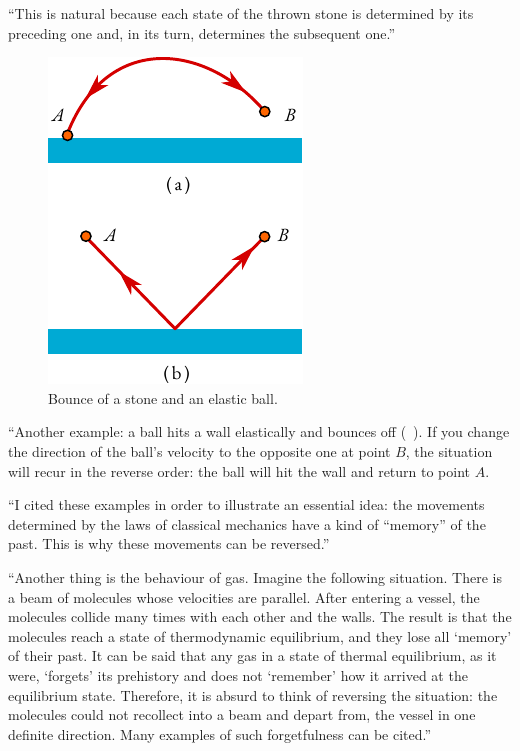\begin{dialogue}
\prtnr ``This is natural because each state of the thrown stone is
determined by its preceding one and, in its turn, determines the subsequent one.''
\begin{figure}%
\centering
\includegraphics[width=\textwidth]{figures/reflect.pdf}
\caption{Bounce of a stone and an elastic ball.\label{reflect}}
\end{figure}

\athr ``Another example: a ball hits a wall elastically and bounces
off (~). If you change the direction of the ball's velocity to the opposite one at point $B$, the situation will recur in the reverse order: the ball will hit the wall and return to point $A$.

``I cited these examples in order to illustrate an essential idea: the movements determined by the laws of classical mechanics have a kind of ``memory'' of the past. This is why these movements can be reversed.''

``Another thing is the behaviour of gas. Imagine the following situation. There is a beam of molecules whose velocities are parallel. After entering a vessel, the molecules collide many times with each other and the walls. The result is that the molecules reach a state of thermodynamic equilibrium, and they lose all `memory' of their past. It can be said that any gas in a state of thermal equilibrium, as it were, `forgets' its prehistory and does not `remember' how it arrived at the equilibrium state. Therefore, it is absurd to think of reversing the situation: the molecules could not recollect into a beam and depart from, the vessel in one definite direction. Many examples of such forgetfulness can be cited.''


\end{dialogue}
